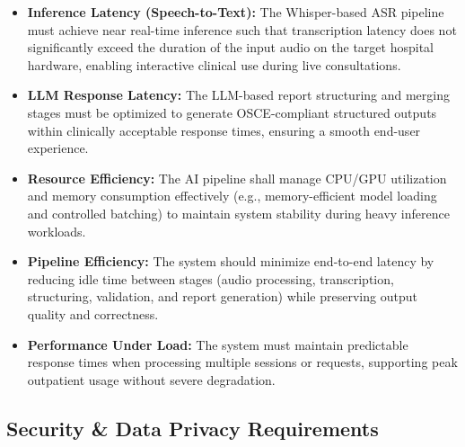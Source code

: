 \begin{itemize}
    \item \textbf{Inference Latency (Speech-to-Text):} The Whisper-based ASR pipeline must achieve near real-time inference such that transcription latency does not significantly exceed the duration of the input audio on the target hospital hardware, enabling interactive clinical use during live consultations.

    \item \textbf{LLM Response Latency:} The LLM-based report structuring and merging stages must be optimized to generate OSCE-compliant structured outputs within clinically acceptable response times, ensuring a smooth end-user experience.

    \item \textbf{Resource Efficiency:} The AI pipeline shall manage CPU/GPU utilization and memory consumption effectively (e.g., memory-efficient model loading and controlled batching) to maintain system stability during heavy inference workloads.

    \item \textbf{Pipeline Efficiency:} The system should minimize end-to-end latency by reducing idle time between stages (audio processing, transcription, structuring, validation, and report generation) while preserving output quality and correctness.

    \item \textbf{Performance Under Load:} The system must maintain predictable response times when processing multiple sessions or requests, supporting peak outpatient usage without severe degradation.
\end{itemize}

\subsection{Security \& Data Privacy Requirements}\label{sec:analysis:nfr:security}


